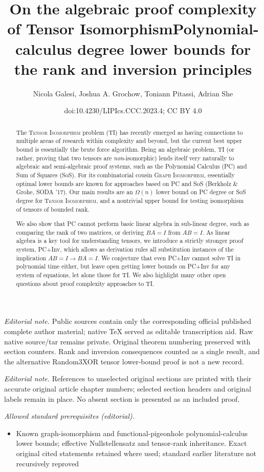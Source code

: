 \documentclass[10pt,a4paper]{article}
\title{On the algebraic proof complexity of Tensor Isomorphism}
\title{Polynomial-calculus degree lower bounds for the rank and inversion principles}
\author{Nicola Galesi, Joshua A. Grochow, Toniann Pitassi, Adrian She}
\date{doi:10.4230/LIPIcs.CCC.2023.4; CC BY 4.0}
\theoremstyle{definition}
\begin{document}
\maketitle
\noindent\textit{Editorial note.} Public sources contain only the corresponding official published complete author material; native TeX served as editable transcription aid. Raw native source/tar remains private. Original theorem numbering preserved with section counters. Rank and inversion consequences counted as a single result, and the alternative Random3XOR tensor lower-bound proof is not a new record.\par\medskip
\noindent\textit{Editorial note.} References to unselected original sections are printed with their accurate original article chapter numbers; selected section headers and original labels remain in place. No absent section is presented as an included proof.\par\medskip
\noindent\textit{Allowed standard prerequisites (editorial).}\begin{itemize}
\item Known graph-isomorphism and functional-pigeonhole polynomial-calculus lower bounds; effective Nullstellensatz and tensor-rank inheritance. Exact original cited statements retained where used; standard earlier literature not recursively reproved
\end{itemize}\medskip


\begin{abstract}
The \textsc{Tensor Isomorphism} problem (\textsc{TI}) has recently emerged as having connections to multiple areas of research within complexity and beyond, but the current best upper bound is essentially the brute force algorithm. Being an algebraic problem, \textsc{TI} (or rather, proving that two tensors are \emph{non}-isomorphic) lends itself very naturally to algebraic and semi-algebraic proof systems, such as the Polynomial Calculus (PC) and Sum of Squares (SoS). For its combinatorial cousin \textsc{Graph Isomorphism}, essentially optimal lower bounds are known for approaches based on PC and SoS (Berkholz \& Grohe, SODA '17). Our main results are an $\Omega(n)$ lower bound on PC degree or SoS degree for \textsc{Tensor Isomorphism}, and a nontrivial upper bound for testing isomorphism of tensors of bounded rank.

We also show that PC cannot perform basic linear algebra in sub-linear degree, such as comparing the rank of two matrices, or deriving $BA=I$ from $AB=I$. As linear algebra is a key tool for understanding tensors, we introduce a strictly stronger proof system, PC+Inv, which allows as derivation rules all substitution instances of the implication $AB=I \rightarrow BA=I$. We conjecture that even PC+Inv cannot solve  \textsc{TI} in polynomial time either, but leave open getting lower bounds on PC+Inv for any system of equations, let alone those for \textsc{TI}. We also highlight many other open questions about proof complexity approaches to \textsc{TI}.
\end{abstract}
\end{document}
